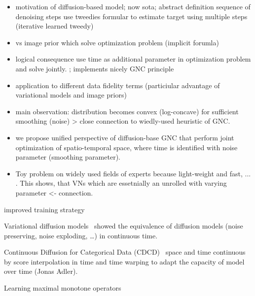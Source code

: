 \documentclass{article}
\theoremstyle{plain}
\theoremstyle{definition}
\theoremstyle{remark}
\begin{document}
\begin{itemize}
    \item motivation of diffusion-based model; now sota; abstract definition sequence of denoising steps
    use tweedies formular to estimate target using multiple steps (iterative learned tweedy)
    \item vs image prior which solve optimization problem (implicit forumla)
    \item logical consequence use time as additional parameter in optimization problem and solve jointly.
    ; implements nicely GNC principle

    \item application to different data fidelity terms (particiular advantage of variational models and image priors)
    
    \item main observation: distribution becomes convex (log-concave) for sufficient smoothing (noise) > close connection to wiedly-used heuristic of GNC.
    \item we propose unified perspective of diffusion-base GNC that perform joint optimization of spatio-temporal space, where time is identified with noise parameter (smoothing parameter).
    \item Toy problem on widely used fields of experts because light-weight and fast, ... . This shows, that VNs which are essetnially an unrolled with varying parameter <- connection.
\end{itemize}




\cite{NiDh21} improved training strategy 


Variational diffusion models~\cite{KiSa21} showed the equivalence of diffusion models (noise preserving, noise exploding, \ldots) in continuous time.


Continuous Diffusion for Categorical Data (CDCD)~\cite{DiSa22} space and time continuous by score interpolation in time and time warping to adapt the capacity of model over time (Jonas Adler).


Learning maximal monotone operators~\cite{PeRe21, TeRe21}



\end{document}
